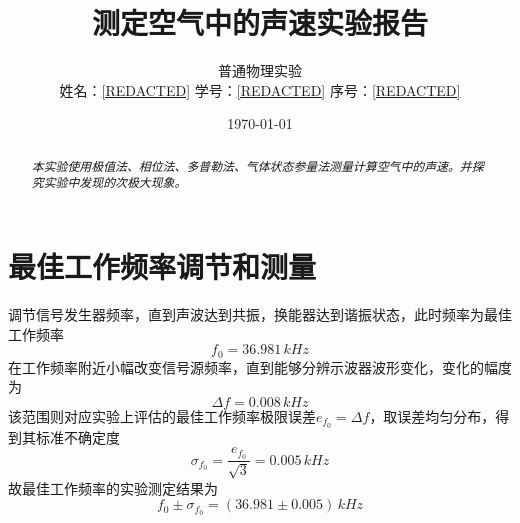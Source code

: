 \documentclass[10pt, twocolumn]{article}
\title{\Large\bfseries 测定空气中的声速实验报告} %
\author{%
    \normalsize %
    普通物理实验 \quad [REDACTED] \\[0.5em] %
    \normalsize 姓名：\underline{\hspace{0.6cm}[REDACTED]\hspace{0.5cm}} %
    \quad %
    \normalsize 学号：\underline{\hspace{0.1cm}[REDACTED]\hspace{0.1cm}} %
    \quad %
    \normalsize 序号：\underline{\hspace{0.9cm}[REDACTED]\hspace{0.9cm}} %
}
\date{\small\today} %
\begin{document}
\maketitle %

\begin{abstract}
\noindent %
\small %
\emph{本实验使用极值法、相位法、多普勒法、气体状态参量法测量计算空气中的声速。并探究实验中发现的次极大现象。}
\end{abstract}

\section{最佳工作频率调节和测量}
\label{sec:f_0}
调节信号发生器频率，直到声波达到共振，换能器达到谐振状态，此时频率为最佳工作频率
\[
    f_0 = \SI{36.981} \, kHz
\]
在工作频率附近小幅改变信号源频率，直到能够分辨示波器波形变化，变化的幅度为
\[
    \Delta f = \SI{0.008} \, kHz
\]
该范围则对应实验上评估的最佳工作频率极限误差$e_{f_0}=\Delta f$，取误差均匀分布，得到其标准不确定度
\[
    \sigma_{f_0} = \frac{e_{f_0}}{\sqrt{3}} = \SI{0.005} \, kHz
\]
故最佳工作频率的实验测定结果为
\begin{equation}
    f_0 \pm \sigma_{f_0} = (36.981 \pm 0.005) \, kHz
\end{equation}
\end{document}
